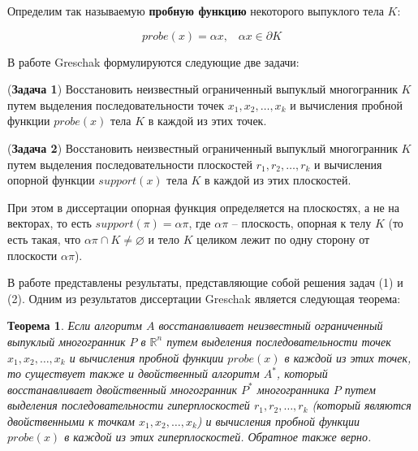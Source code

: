 \documentclass[a4paper, 12pt, titlepage]{article}
\theoremstyle{definition}
\theoremstyle{plain}
\newtheorem{SmartTheorem}{Теорема}
\theoremstyle{plain}
\begin{document}
Определим так называемую \textbf{пробную функцию} некоторого выпуклого тела $K$:

\begin{equation}
 probe(x) = \alpha x, \;\;\; \alpha x \in \partial K
\end{equation}

В работе Greschak формулируются следующие две задачи:

\begin{flushleft}
 (\textbf{Задача 1}) Восстановить неизвестный ограниченный выпуклый
 многогранник $K$ путем выделения последовательности точек
 $x_{1}, x_{2}, \ldots, x_{k}$ и вычисления пробной функции $probe(x)$ тела $K$
 в каждой из этих точек.
\end{flushleft}

\begin{flushleft}
 (\textbf{Задача 2}) Восстановить неизвестный ограниченный выпуклый
 многогранник $K$ путем выделения последовательности плоскостей
 $r_{1}, r_{2}, \ldots, r_{k}$ и вычисления опорной функции $support(x)$ тела
 $K$ в каждой из этих плоскостей.
\end{flushleft}

При этом в диссертации опорная функция определяется на плоскостях, а не на
векторах, то есть $support(\pi) = \alpha \pi$, где $\alpha \pi$ -- плоскость,
опорная к телу $K$ (то есть такая, что $\alpha \pi \cap K \neq \varnothing$ и
тело $K$ целиком лежит по одну сторону от плоскости $\alpha \pi$).

В работе представлены результаты, представляющие собой решения задач (1) и 
(2). Одним из результатов диссертации Greschak является следующая теорема:

\begin{SmartTheorem}
 Если алгоритм $A$ восстанавливает неизвестный ограниченный выпуклый 
 многогранник $P$ в $\mathbb{R}^{n}$ путем выделения последовательности точек
 $x_{1}, x_{2}, \ldots, x_{k}$ и вычисления пробной функции $probe(x)$ в каждой 
 из этих точек, то существует также и двойственный алгоритм $A^{*}$, который
 восстанавливает двойственный многогранник $P^{*}$ многогранника $P$ путем
 выделения последовательности гиперплоскостей $r_{1}, r_{2}, \ldots, r_{k}$
 (который являются двойственными к точкам $x_{1}, x_{2}, \ldots, x_{k}$)
 и вычисления пробной функции $probe(x)$ в каждой из этих гиперплоскостей.
 Обратное также верно.
\end{SmartTheorem}


\end{document}
